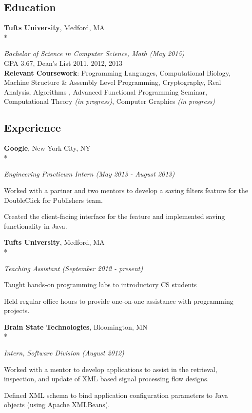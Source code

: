 \documentclass{article}
\newcommand{\position}[2]{
  \textit{#1 (#2)}
}
\newcommand{\affiliation}[2]{
  \textbf{#1}, #2 \\*
}
\newenvironment{achievements}{
  \begin{compactitem} }{
  \end{compactitem}
}
\newcommand{\skill}[2]{
  \textbf{#1}: #2
  \smallskip
}
\begin{document}
\subsection*{Education}
  \affiliation{Tufts University}                             {Medford, MA}
    \position{Bachelor of Science in Computer Science, Math} {May 2015} \\
  GPA 3.67, Dean's List 2011, 2012, 2013 \\
  \skill{Relevant Coursework}
        {Programming Languages, Computational Biology, Machine Structure \&
        Assembly Level Programming, Cryptography, Real Analysis, Algorithms
        , Advanced Functional Programming Seminar, Computational Theory
        \textit{(in progress)}, Computer Graphics \textit{(in progress)}}

\subsection*{Experience}
  \affiliation{Google}                       {New York City, NY}
    \position {Engineering Practicum Intern} {May 2013 - August 2013}
    \begin{achievements}
      \item Worked with a partner and two mentors to develop a
            saving filters feature for the \\ DoubleClick for Publishers team.
      \item Created the client-facing interface for the feature and
      implemented saving functionality in Java.
    \end{achievements}
    \smallskip

  \affiliation{Tufts University}   {Medford, MA}
    \position {Teaching Assistant} {September 2012 - present}
    \begin{achievements}
      \item Taught hands-on programming labs to introductory CS students
      \item Held regular office hours to provide one-on-one assistance with
            programming projects.
    \end{achievements}
    \smallskip

  \affiliation{Brain State Technologies}  {Bloomington, MN}
    \position {Intern, Software Division} {August 2012}
    \begin{achievements}
      \item Worked with a mentor to develop applications to assist in the
            retrieval, inspection, and update of XML based signal processing 
            flow designs.
      \item Defined XML schema to bind application configuration parameters to 
            Java objects (using Apache XMLBeans).
    \end{achievements}
\end{document}
